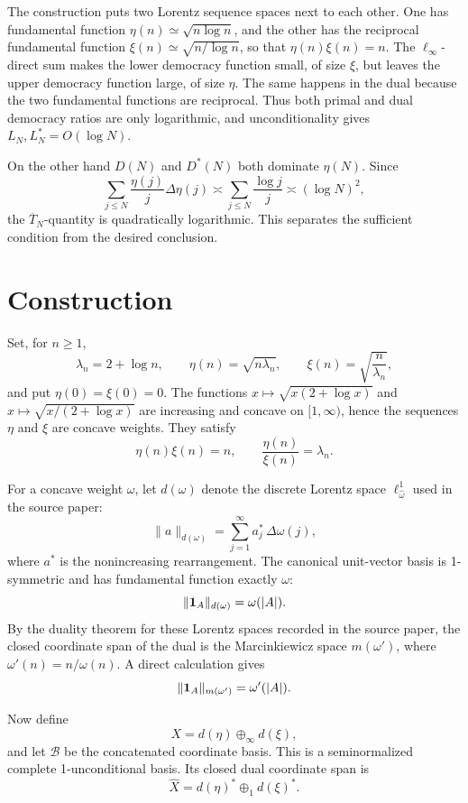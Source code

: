 \documentclass[11pt]{article}
\newcommand{\OT}{\overline T}
\begin{document}
The construction puts two Lorentz sequence spaces next to each other.  One has
fundamental function \(\eta(n)\simeq \sqrt{n\log n}\), and the other has the
reciprocal fundamental function \(\xi(n)\simeq \sqrt{n/\log n}\), so that
\(\eta(n)\xi(n)=n\).  The \(\ell_\infty\)-direct sum makes the lower democracy
function small, of size \(\xi\), but leaves the upper democracy function large,
of size \(\eta\).  The same happens in the dual because the two fundamental
functions are reciprocal.  Thus both primal and dual democracy ratios are only
logarithmic, and unconditionality gives \(L_N,L_N^*=O(\log N)\).

On the other hand \(D(N)\) and \(D^*(N)\) both dominate \(\eta(N)\).  Since
\[
   \sum_{j\le N} \frac{\eta(j)}{j}\Delta\eta(j)
        \asymp \sum_{j\le N}\frac{\log j}{j}
        \asymp (\log N)^2,
\]
the \(\OT_N\)-quantity is quadratically logarithmic.  This separates the
sufficient condition from the desired conclusion.

\section{Construction}

Set, for \(n\ge 1\),
\[
   \lambda_n=2+\log n,\qquad
   \eta(n)=\sqrt{n\lambda_n},\qquad
   \xi(n)=\sqrt{\frac{n}{\lambda_n}},
\]
and put \(\eta(0)=\xi(0)=0\).  The functions
\(x\mapsto \sqrt{x(2+\log x)}\) and \(x\mapsto \sqrt{x/(2+\log x)}\) are
increasing and concave on \([1,\infty)\), hence the sequences \(\eta\) and
\(\xi\) are concave weights.  They satisfy
\[
   \eta(n)\xi(n)=n,\qquad \frac{\eta(n)}{\xi(n)}=\lambda_n.
\]

For a concave weight \(\omega\), let \(d(\omega)\) denote the discrete Lorentz
space \(\ell^1_{\widehat \omega}\) used in the source paper:
\[
   \|a\|_{d(\omega)}=\sum_{j=1}^{\infty} a_j^*\,\Delta\omega(j),
\]
where \(a^*\) is the nonincreasing rearrangement.  The canonical unit-vector
basis is 1-symmetric and has fundamental function exactly \(\omega\):
\[
   \|{\bf 1}_A\|_{d(\omega)}=\omega(|A|).
\]
By the duality theorem for these Lorentz spaces recorded in the source paper,
the closed coordinate span of the dual is the Marcinkiewicz space
\(m(\omega')\), where \(\omega'(n)=n/\omega(n)\).  A direct calculation gives
\[
   \|{\bf 1}_A\|_{m(\omega')}=\omega'(|A|).
\]

Now define
\[
   X=d(\eta)\oplus_\infty d(\xi),
\]
and let \(\mathcal B\) be the concatenated coordinate basis.  This is a
seminormalized complete 1-unconditional basis.  Its closed dual coordinate
span is
\[
   \widehat X=d(\eta)^*\oplus_1 d(\xi)^* .
\]
\end{document}
